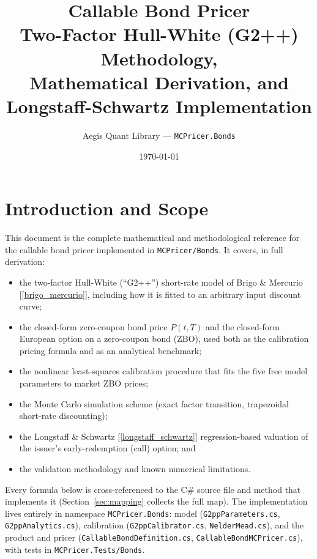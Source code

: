\documentclass[11pt,a4paper]{article}
\title{\textbf{Callable Bond Pricer}\\[0.4em]
       \large Two-Factor Hull-White (G2++) Methodology,\\
       Mathematical Derivation, and Longstaff-Schwartz Implementation}
\author{Aegis Quant Library --- \texttt{MCPricer.Bonds}}
\date{\today}
\newcommand{\coderef}[1]{\texttt{\color{blue!60!black}#1}}
\theoremstyle{definition}
\begin{document}
\maketitle
\tableofcontents
\newpage

\section{Introduction and Scope}
\label{sec:intro}

This document is the complete mathematical and methodological reference for
the callable bond pricer implemented in \coderef{MCPricer/Bonds}. It covers,
in full derivation:

\begin{itemize}[nosep]
  \item the two-factor Hull-White (``G2++'') short-rate model of
        Brigo \& Mercurio [\ref{brigo_mercurio}], including how it is fitted
        to an arbitrary input discount curve;
  \item the closed-form zero-coupon bond price $P(t,T)$ and the closed-form
        European option on a zero-coupon bond (ZBO), used both as the
        calibration pricing formula and as an analytical benchmark;
  \item the nonlinear least-squares calibration procedure that fits the five
        free model parameters to market ZBO prices;
  \item the Monte Carlo simulation scheme (exact factor transition,
        trapezoidal short-rate discounting);
  \item the Longstaff \& Schwartz [\ref{longstaff_schwartz}] regression-based
        valuation of the issuer's early-redemption (call) option; and
  \item the validation methodology and known numerical limitations.
\end{itemize}

Every formula below is cross-referenced to the C\# source file and method
that implements it (Section~\ref{sec:mapping} collects the full map). The
implementation lives entirely in namespace \coderef{MCPricer.Bonds}: model
(\coderef{G2ppParameters.cs}, \coderef{G2ppAnalytics.cs}), calibration
(\coderef{G2ppCalibrator.cs}, \coderef{NelderMead.cs}), and the product and
pricer (\coderef{CallableBondDefinition.cs},
\coderef{CallableBondMCPricer.cs}), with tests in
\coderef{MCPricer.Tests/Bonds}.
\end{document}
